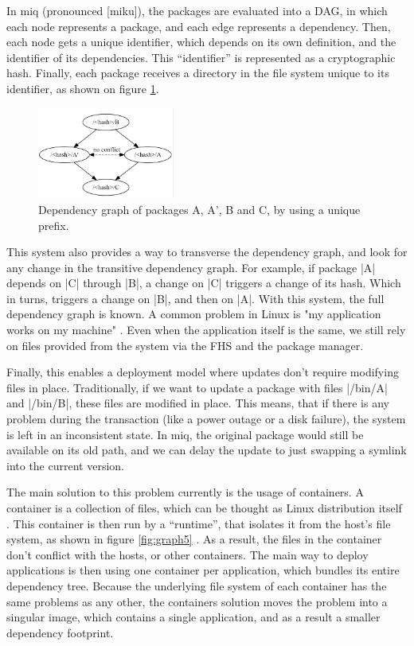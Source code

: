 In miq (pronounced [miku]), the packages are evaluated into a \ac{DAG}, in which
each node represents a package, and each edge represents a dependency. Then,
each node gets a unique identifier, which depends on its own definition, and the
identifier of its dependencies. This ``identifier'' is represented as a
cryptographic hash. Finally, each package receives a
directory in the file system
unique to its identifier, as shown on figure \ref{fig:graph4}.


\begin{figure}
    \centering
    \includegraphics[width=0.4\textwidth]{Screenshot 2023-05-29 164148.png}
    \caption{Dependency graph of packages A, A', B and C, by using a unique prefix.}
    \label{fig:graph4}
\end{figure}



This system also provides a way to transverse the dependency graph, and look for
any change in the transitive dependency graph. For example, if package |A|
depends on |C| through |B|, a change on |C| triggers a change of its hash. Which
in turns, triggers a change on |B|, and then on |A|. With this system, the full
dependency graph is known. A common problem in Linux is "my application works on
my machine" \cite{mukherjeeFixingDependencyErrors2021}. Even when the application itself is the same, we still rely on
files provided from the system via the \ac{FHS} and the package manager.

Finally, this enables a deployment model where updates don't require modifying
files in place. Traditionally, if we want to update a package with files
|/bin/A| and |/bin/B|, these files are modified in place. This means, that if
there is any problem during the transaction (like a power outage or a disk
failure), the system is left in an inconsistent state. In miq, the original
package would still be available on its old path, and we can delay the update to
just swapping a symlink into the current version.

The main solution to this problem currently is the usage of containers. A
container is a collection of files, which can be thought as Linux distribution
itself \cite{DockerAcceleratedContainerized2022} \cite{merkelDockerLightweightLinux2014}. This container is then run by a ``runtime'', that isolates it from the
host's file system, as shown in figure \ref{fig:graph5} . As a result, the files in the container don't conflict with
the hosts, or other containers. The main way to deploy applications is then
using one container per application, which bundles its entire dependency tree.
Because the underlying file system of each container has the same problems as any
other, the containers solution moves the problem into a singular image, which
contains a single application, and as a result a smaller dependency footprint.


